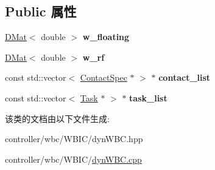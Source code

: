 \subsection*{Public 属性}
\begin{DoxyCompactItemize}
\item 
\mbox{\label{classquadruped_1_1DynWBC_a9a04ee0db872de798abe7cb3f571eaa5}} 
\hyperlink{cppTypes_8h_a5db6bfb25afa103db1fb6bb6287ae9d7}{D\+Mat}$<$ double $>$ {\bfseries w\+\_\+floating}
\item 
\mbox{\label{classquadruped_1_1DynWBC_a9d09d5faede19d842e5a17da328e4e23}} 
\hyperlink{cppTypes_8h_a5db6bfb25afa103db1fb6bb6287ae9d7}{D\+Mat}$<$ double $>$ {\bfseries w\+\_\+rf}
\item 
\mbox{\label{classquadruped_1_1DynWBC_a1e5ae78991b3214d3774f0d5422210d7}} 
const std\+::vector$<$ \hyperlink{classquadruped_1_1ContactSpec}{Contact\+Spec} $\ast$ $>$ $\ast$ {\bfseries contact\+\_\+list}
\item 
\mbox{\label{classquadruped_1_1DynWBC_a06fff363979f875745569e1edc7e3367}} 
const std\+::vector$<$ \hyperlink{classquadruped_1_1Task}{Task} $\ast$ $>$ $\ast$ {\bfseries task\+\_\+list}
\end{DoxyCompactItemize}


该类的文档由以下文件生成\+:\begin{DoxyCompactItemize}
\item 
controller/wbc/\+W\+B\+I\+C/dyn\+W\+B\+C.\+hpp\item 
controller/wbc/\+W\+B\+I\+C/\hyperlink{dynWBC_8cpp}{dyn\+W\+B\+C.\+cpp}\end{DoxyCompactItemize}

